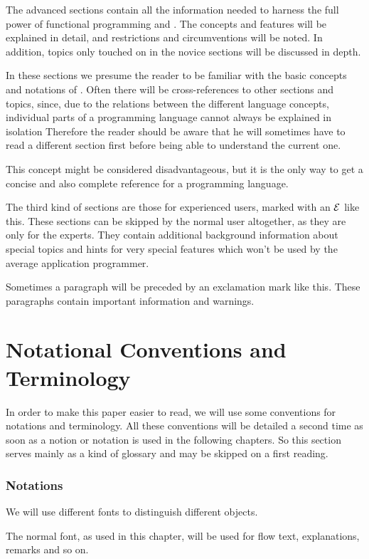 The advanced sections  contain all the information needed to harness 
the full power of functional programming and \opal. 
The concepts and features will be explained in detail, and restrictions
and circumventions will be noted.
In addition, topics only touched on in the novice sections will be discussed in
depth. 

In these sections we presume the reader to be familiar with the
basic concepts and notations of \opal. 
 Often there will be cross-references to other sections and topics,
 since, due to the relations between the different language concepts,
 individual parts of a programming language cannot always be explained
 in isolation
Therefore the reader should be aware that he will sometimes have to read a different
section first before being able to understand the current one.

This concept might be considered disadvantageous, but it is the only
way to get a concise and also complete reference for a
programming language.

\experienced The third kind of sections are those for experienced
users, marked with an $\cal E$ like this.
These sections can be skipped  by the normal user altogether, as they
are only for the experts.
They contain additional background information about special topics and
hints for very special features which won't be used by the average
application programmer.

\important Sometimes a paragraph will be preceded by an exclamation
mark like this. These paragraphs contain important information
and warnings.

\section{Notational Conventions and Terminology}
\label{sec:notation}
\novice 
In order to make this paper easier to read, we will use some
conventions for notations and terminology.
All these conventions will be detailed a second time as soon as  a notion or
notation is used in the following chapters.
So this section serves mainly as a kind of glossary and may
be skipped on a first reading.


\subsubsection{Notations}
\novice 
We will use different fonts to distinguish different objects.

\hspace{1em} The normal font, as used in  this chapter, will be used for flow
text, explanations, remarks and so on.

